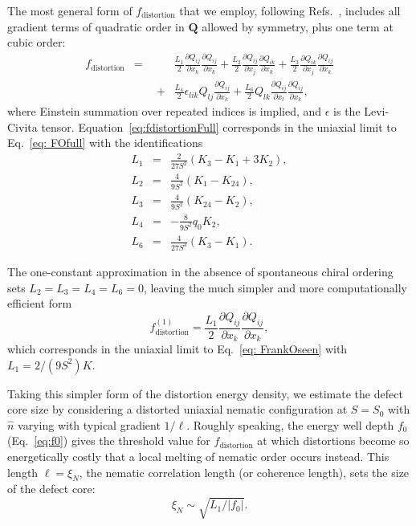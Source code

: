 \documentclass[utf8]{frontiersFPHY} %
\newcommand{\Q}{\mathbf{Q}}
\begin{document}
The most general form of $f_{\mathrm{distortion}}$ that we employ, following Refs.~\cite{poniewierski1985free,Mori1999, mottram2014introduction},  includes all gradient terms of quadratic order in $\Q$ allowed by symmetry, plus one term at cubic order: 
\begin{eqnarray} 
f_{\mathrm{distortion}} &=& \frac{L_1}{2}\frac{\partial Q_{ij}}{\partial x_k}\frac{\partial Q_{ij}}{\partial x_k}   + \frac{L_2}{2}\frac{\partial Q_{ij}}{\partial x_j}\frac{\partial Q_{ik}}{\partial x_k} + \frac{L_3}{2}\frac{\partial Q_{ik}}{\partial x_j}\frac{\partial Q_{ij}}{\partial x_k} \nonumber \\
&\quad\quad+& \frac{L_4}{2}\epsilon_{lik}Q_{lj}\frac{\partial Q_{ij}}{\partial x_k} + \frac{L_6}{2} Q_{lk} \frac{\partial Q_{ij}}{\partial x_l}\frac{\partial Q_{ij}}{\partial x_k}, \label{eq:fdistortionFull}
\end{eqnarray}
where Einstein summation over repeated indices is implied, and $\epsilon$ is the Levi-Civita tensor. Equation~\ref{eq:fdistortionFull}  corresponds in the uniaxial limit to Eq.~\ref{eq: FOfull} with the identifications \cite{Mori1999}
\begin{eqnarray*}
L_1 &=& \frac{2}{27 S^2} \left(K_3-K_1+3 K_2 \right), \\
L_2 &=& \frac{4}{9S^2} \left(K_1 - K_{24} \right), \\
L_3 &=& \frac{4}{9S^2} \left( K_{24} - K_2 \right), \\
L_4 &=& - \frac{8}{9 S^2} q_0 K_2, \\
L_6 &=& \frac{4}{27S^3} (K_3 - K_1 ). 
\end{eqnarray*} 

The one-constant approximation in the absence of spontaneous chiral ordering sets $L_2=L_3=L_4=L_6=0$, leaving the much simpler and more computationally efficient form 
\begin{equation}\label{eq:fd1}
f_{\mathrm{distortion}}^{(1)} = \frac{L_1}{2} \frac{\partial Q_{ij}}{\partial x_k}\frac{\partial Q_{ij}}{\partial x_k},
\end{equation}
which corresponds in the uniaxial limit to Eq.~\ref{eq: FrankOseen} with $L_1 = 2/(9S^2) K$. 

Taking this simpler form of the distortion energy density, we estimate the defect core size by considering a distorted uniaxial nematic configuration at $S=S_0$ with $\hat n$ varying with typical gradient $1/\ell$. Roughly speaking, the energy well depth $f_0$ (Eq.~\ref{eq:f0}) gives the threshold value for $f_{\mathrm{distortion}}$ at which distortions become so energetically costly that a local melting of nematic order occurs instead. This length  $\ell = \xi_N$, the nematic correlation length (or coherence length), sets the size of the defect core: %
\begin{equation}\label{eq:xiN}
\xi_N \sim \sqrt{L_1/|f_0|}. 
\end{equation}
\end{document}

